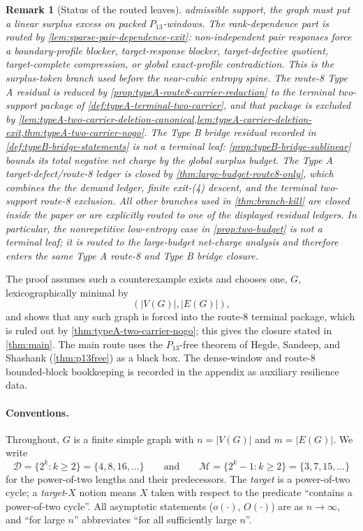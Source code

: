 \documentclass[11pt]{article}
\newtheorem{remark}[theorem]{Remark}
\newcommand{\Mers}{\mathcal M}
\newcommand{\Pow}{\mathcal D}
\begin{document}
\begin{remark}[Status of the routed leaves]
admissible support, the graph must put a linear surplus excess on packed
\(P_{13}\)-windows.  The rank-dependence part is routed by
\cref{lem:sparse-pair-dependence-exit}: non-independent pair responses force a
boundary-profile blocker, target-response blocker, target-defective quotient,
target-complete compression, or global exact-profile contradiction.  This is
the surplus-token branch used before the near-cubic entropy spine.  The
route-8 Type A residual is reduced by
\cref{prop:typeA-route8-carrier-reduction} to the terminal two-support package
of \cref{def:typeA-terminal-two-carrier}, and that package is excluded by
\cref{lem:typeA-two-carrier-deletion-canonical,lem:typeA-carrier-deletion-exit,thm:typeA-two-carrier-nogo}.
The Type B bridge residual recorded in \cref{def:typeB-bridge-statements} is not
a terminal leaf: \cref{prop:typeB-bridge-sublinear} bounds its total negative
net charge by the global surplus budget.  The Type A target-defect/route-8
ledger is closed by \cref{thm:large-budget-route8-only}, which combines the
the demand ledger, finite exit-\textup{(4)} descent, and the terminal two-support
route-8 exclusion.  All other branches used in \cref{thm:branch-kill} are closed
inside the paper or are explicitly routed to one of the displayed residual
ledgers.
In particular, the nonrepetitive low-entropy case in \cref{prop:two-budget} is
not a terminal leaf; it is routed to the large-budget net-charge analysis and
therefore enters the same Type A route-8 and Type B bridge closure.
\end{remark}

The proof assumes such a counterexample exists and chooses one, $G$,
lexicographically minimal by
\[
(|V(G)|,|E(G)|),
\]
and shows that any such graph is forced into the route-8 terminal package, which
is ruled out by \cref{thm:typeA-two-carrier-nogo}; this gives the closure
stated in \cref{thm:main}.  The main route uses the $P_{13}$-free theorem of
Hegde, Sandeep, and Shashank (\cref{thm:p13free}) as a black box.  The
dense-window and route-8 bounded-block bookkeeping is recorded in the appendix as
auxiliary resilience data.

\paragraph{Conventions.}
Throughout, $G$ is a finite simple graph with $n=|V(G)|$ and $m=|E(G)|$.  We write
\[
\Pow=\{2^{k}:k\ge2\}=\{4,8,16,\dots\}
\qquad\text{and}\qquad
\Mers=\{2^{k}-1:k\ge2\}=\{3,7,15,\dots\}
\]
for the power-of-two lengths and their predecessors.  The \emph{target} is a power-of-two cycle; a \emph{target}-$X$ notion means $X$ taken with respect to the predicate ``contains a power-of-two cycle''.  All asymptotic statements ($o(\cdot)$, $O(\cdot)$) are as $n\to\infty$, and ``for large $n$'' abbreviates ``for all sufficiently large $n$''.
\end{document}
